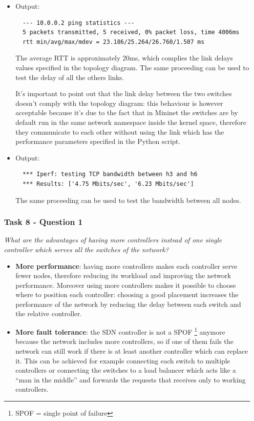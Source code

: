 \begin{itemize}
  \item {}

  Output:
  \begin{lstlisting}
  --- 10.0.0.2 ping statistics ---
  5 packets transmitted, 5 received, 0% packet loss, time 4006ms
  rtt min/avg/max/mdev = 23.186/25.264/26.760/1.507 ms
  \end{lstlisting}
  The average RTT is approximately 20ms, which complies the link delays values
  specified in the topology diagram. The same proceeding can be used to test the
  delay of all the others links.

  It's important to point out that the link delay between the two switches doesn't
  comply with the topology diagram: this behaviour is however acceptable because it's due to
  the fact that in Mininet the switches are by default run in the same network
  namespace inside the kernel space, therefore they communicate to each other
  without using the link which has the performance parameters specified
  in the Python script.

  \item {}

  Output:
  \begin{lstlisting}
  *** Iperf: testing TCP bandwidth between h3 and h6
  *** Results: ['4.75 Mbits/sec', '6.23 Mbits/sec']
  \end{lstlisting}

  The same proceeding can be used to test the bandwidth between all nodes.
\end{itemize}



\subsubsection*{Task 8 - Question 1}
\textit{What are the advantages of having more controllers instead of
one single controller which serves all the switches of the network?}
\begin{itemize}
  \item \textbf{More performance}:  having more controllers makes each controller serve fewer
  nodes, therefore reducing its workload and improving the network performance.
  Moreover using more controllers makes it possible to choose where to position
  each controller: choosing a good placement increases the performance
  of the network by reducing the delay between each switch and the relative
  controller.
  \item \textbf{More fault tolerance}: the SDN controller is not a SPOF \footnote{SPOF = single point of failure}
  anymore because the network includes more controllers, so if one of them
  fails the network can still work if there is at least another controller which can replace it.
  This can be achieved for example connecting each switch to multiple controllers
  or connecting the switches to a load balancer which acts like a ``man in the middle'' and
  forwards the requests that receives only to working controllers.
\end{itemize}


